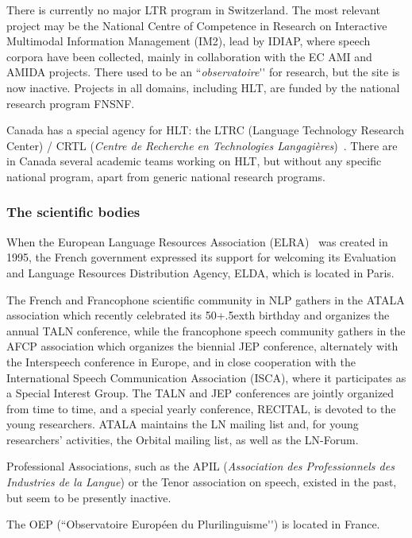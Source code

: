 \begin{multicols}{2}
There is currently no major LTR program in Switzerland. The most
relevant project may be the National Centre of Competence in Research
on Interactive Multimodal Information Management (IM2), lead by IDIAP,
where speech corpora have been collected, mainly in collaboration with
the EC AMI and AMIDA projects. There used to be an ``{\em observatoire}{\mbox '}{\mbox '} for
research, but the site is now inactive. Projects in all domains,
including HLT, are funded by the national research program FNSNF.

Canada has a special agency for HLT: the LTRC (Language Technology
Research Center) / CRTL ({\em Centre de Recherche en Technologies
Langagières})~\cite{canadacrtl}. There are in Canada several academic teams working on
HLT, but without any specific national program, apart from generic
national research programs.

\subsubsection{The scientific bodies}

When the European Language Resources Association (ELRA)~\cite{elra} was created
in 1995, the French government expressed its support for welcoming its
Evaluation and Language Resources Distribution Agency, ELDA, which is
located in Paris.

The French and Francophone scientific community in NLP gathers in the
ATALA association which recently celebrated its 50\raise+.5ex\hbox{th} birthday and
organizes the annual TALN conference, while the francophone speech
community gathers in the AFCP association which organizes the biennial
JEP conference, alternately with the Interspeech conference in Europe,
and in close cooperation with the International Speech Communication
Association (ISCA), where it participates as a Special Interest
Group. The TALN and JEP conferences are jointly organized from time to
time, and a special yearly conference, RECITAL, is devoted to the
young researchers. ATALA maintains the LN mailing list and, for young
researchers’ activities, the Orbital mailing list, as well as the
LN-Forum.

Professional Associations, such as the APIL ({\em Association des
Professionnels des Industries de la Langue}) or the Tenor association
on speech, existed in the past, but seem to be presently inactive.

The OEP (``Observatoire Européen du Plurilinguisme{\mbox '}{\mbox '}) is located in France\cite{OEP}.


\end{multicols}
